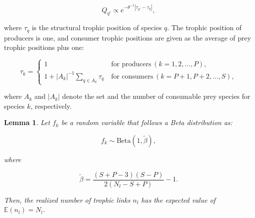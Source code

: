 \documentclass[11pt, class=article, crop=false]{standalone}
\newtheorem{lemma}{Lemma}[subsection]
\theoremstyle{definition}
\begin{document}
\begin{equation}
    Q_{q'} \propto e^{-\theta^{-1} |\tau_{q'} - \tau_q|},
\end{equation}

where $\tau_q$ is the structural trophic position of species $q$.
The trophic position of producers is one, and
consumer trophic positions are given as the average of prey trophic positions plus one:

\begin{equation}
    \tau_k = 
    \begin{cases}
    1 & ~\text{for producers}~ (k=1, 2, \ldots, P),\\
    1 + |A_{k}|^{-1} \sum_{q \in A_{k}} \tau_q & ~\text{for consumers}~ (k = P+1, P+2, \ldots, S),
    \end{cases}
\end{equation}

where $A_{k}$ and $|A_{k}|$ denote the set and the number of consumable prey species for species $k$, respectively.

\begin{lemma}
\label{lemma-beta-tilde}
    Let $f_k$ be a random variable that follows a Beta distribution as:

    \begin{equation}
        f_k \sim \mbox{Beta}(1, \tilde{\beta}),
    \end{equation}

    where

    \begin{equation}
        \tilde{\beta} = \frac{(S + P - 3)(S - P)}{2(N_l - S + P)} - 1.
        \label{eq:beta-tilde}
    \end{equation}

    Then, the realized number of trophic links $n_l$ has the expected value of $\mathbb{E}(n_l) = N_l$.
\end{lemma}
\end{document}
